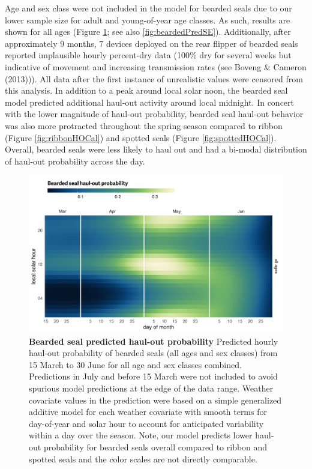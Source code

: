 \documentclass[fleqn,10pt,lineno]{wlpeerj} %
\begin{document}
Age and sex class were not included in the model for bearded seals due to our
lower sample size for adult and young-of-year age classes. As such, results are
shown for all ages (Figure \ref{fig:beardedHOCal}; see also
\ref{fig:beardedPredSE}). Additionally, after approximately 9 months, 7 devices
deployed on the rear flipper of bearded seals reported implausible hourly
percent-dry data (100\% dry for several weeks but indicative of movement and
increasing transmission rates (see Boveng \& Cameron (2013))). All data after the first
instance of unrealistic values were censored from this analysis. In addition to
a peak around local solar noon, the bearded seal model predicted additional
haul-out activity around local midnight. In concert with the lower magnitude of
haul-out probability, bearded seal haul-out behavior was also more protracted
throughout the spring season compared to ribbon (Figure \ref{fig:ribbonHOCal})
and spotted seals (Figure \ref{fig:spottedHOCal}). Overall, bearded seals were
less likely to haul out and had a bi-modal distribution of haul-out probability
across the day.



\begin{figure}
\includegraphics[width=1\linewidth]{../figures/beardedHOCal-1} \caption{\textbf{Bearded seal predicted haul-out probability} \linebreak Predicted hourly haul-out probability of bearded seals (all ages and sex classes) from 15 March to 30 June for all age and sex classes combined. Predictions in July and before 15 March were not included to avoid spurious model predictions at the edge of the data range. Weather covariate values in the prediction were based on a simple generalized additive model for each weather covariate with smooth terms for day-of-year and solar hour to account for anticipated variability within a day over the season. Note, our model predicts lower haul-out probability for bearded seals overall compared to ribbon and spotted seals and the color scales are not directly comparable.}\label{fig:beardedHOCal}
\end{figure}
\end{document}
